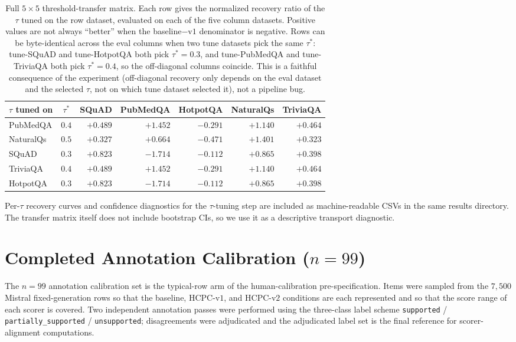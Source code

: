 \begin{table}[!htb]
\centering
\caption{Full $5 \times 5$ threshold-transfer matrix. Each row gives
the normalized recovery ratio of the $\tau$ tuned on the row dataset,
evaluated on each of the five column datasets. Positive values are not
always ``better'' when the baseline$-$v$1$ denominator is negative.
Rows can be byte-identical across the eval columns when two tune
datasets pick the same $\tau^\ast$: tune-SQuAD and tune-HotpotQA both
pick $\tau^\ast = 0.3$, and tune-PubMedQA and tune-TriviaQA both pick
$\tau^\ast = 0.4$, so the off-diagonal columns coincide. This is a
faithful consequence of the experiment (off-diagonal recovery only
depends on the eval dataset and the selected $\tau$, not on which tune
dataset selected it), not a pipeline bug.}
\label{tab:supp:threshold_transfer_full}
\footnotesize
\begin{tabular}{lcrrrrr}
\toprule
$\tau$ tuned on & $\tau^\ast$ & SQuAD & PubMedQA & HotpotQA & NaturalQs & TriviaQA \\
\midrule
PubMedQA  & $0.4$ & $+0.489$ & $+1.452$ & $-0.291$ & $+1.140$ & $+0.464$ \\
NaturalQs & $0.5$ & $+0.327$ & $+0.664$ & $-0.471$ & $+1.401$ & $+0.323$ \\
SQuAD     & $0.3$ & $+0.823$ & $-1.714$ & $-0.112$ & $+0.865$ & $+0.398$ \\
TriviaQA  & $0.4$ & $+0.489$ & $+1.452$ & $-0.291$ & $+1.140$ & $+0.464$ \\
HotpotQA  & $0.3$ & $+0.823$ & $-1.714$ & $-0.112$ & $+0.865$ & $+0.398$ \\
\bottomrule
\end{tabular}
\end{table}

Per-$\tau$ recovery curves and confidence diagnostics for the
$\tau$-tuning step are included as machine-readable CSVs in the same
results directory. The transfer matrix itself does not include
bootstrap CIs, so we use it as a descriptive transport diagnostic.

\section{Completed Annotation Calibration \texorpdfstring{($n=99$)}{(n=99)}}
\label{app:n99}

The $n=99$ annotation calibration set is the typical-row arm of the
human-calibration pre-specification. Items were sampled from the
$7{,}500$ Mistral fixed-generation rows so that the baseline,
HCPC-v$1$, and HCPC-v$2$ conditions are each represented and so that
the score range of each scorer is covered. Two independent annotation
passes were performed using the three-class label scheme
\texttt{supported} / \texttt{partially\_supported} / \texttt{unsupported};
disagreements were adjudicated and the adjudicated label set is the
final reference for scorer-alignment computations.

